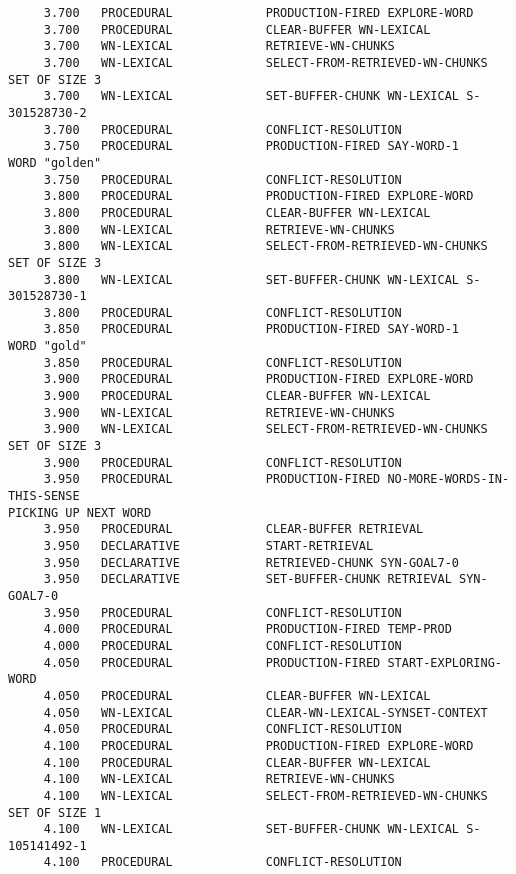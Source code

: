 \begin{verbatim}
     3.700   PROCEDURAL             PRODUCTION-FIRED EXPLORE-WORD 
     3.700   PROCEDURAL             CLEAR-BUFFER WN-LEXICAL 
     3.700   WN-LEXICAL             RETRIEVE-WN-CHUNKS 
     3.700   WN-LEXICAL             SELECT-FROM-RETRIEVED-WN-CHUNKS SET OF SIZE 3 
     3.700   WN-LEXICAL             SET-BUFFER-CHUNK WN-LEXICAL S-301528730-2 
     3.700   PROCEDURAL             CONFLICT-RESOLUTION 
     3.750   PROCEDURAL             PRODUCTION-FIRED SAY-WORD-1 
WORD "golden" 
     3.750   PROCEDURAL             CONFLICT-RESOLUTION 
     3.800   PROCEDURAL             PRODUCTION-FIRED EXPLORE-WORD 
     3.800   PROCEDURAL             CLEAR-BUFFER WN-LEXICAL 
     3.800   WN-LEXICAL             RETRIEVE-WN-CHUNKS 
     3.800   WN-LEXICAL             SELECT-FROM-RETRIEVED-WN-CHUNKS SET OF SIZE 3 
     3.800   WN-LEXICAL             SET-BUFFER-CHUNK WN-LEXICAL S-301528730-1 
     3.800   PROCEDURAL             CONFLICT-RESOLUTION 
     3.850   PROCEDURAL             PRODUCTION-FIRED SAY-WORD-1 
WORD "gold" 
     3.850   PROCEDURAL             CONFLICT-RESOLUTION 
     3.900   PROCEDURAL             PRODUCTION-FIRED EXPLORE-WORD 
     3.900   PROCEDURAL             CLEAR-BUFFER WN-LEXICAL 
     3.900   WN-LEXICAL             RETRIEVE-WN-CHUNKS 
     3.900   WN-LEXICAL             SELECT-FROM-RETRIEVED-WN-CHUNKS SET OF SIZE 3 
     3.900   PROCEDURAL             CONFLICT-RESOLUTION 
     3.950   PROCEDURAL             PRODUCTION-FIRED NO-MORE-WORDS-IN-THIS-SENSE 
PICKING UP NEXT WORD 
     3.950   PROCEDURAL             CLEAR-BUFFER RETRIEVAL 
     3.950   DECLARATIVE            START-RETRIEVAL 
     3.950   DECLARATIVE            RETRIEVED-CHUNK SYN-GOAL7-0 
     3.950   DECLARATIVE            SET-BUFFER-CHUNK RETRIEVAL SYN-GOAL7-0 
     3.950   PROCEDURAL             CONFLICT-RESOLUTION 
     4.000   PROCEDURAL             PRODUCTION-FIRED TEMP-PROD 
     4.000   PROCEDURAL             CONFLICT-RESOLUTION 
     4.050   PROCEDURAL             PRODUCTION-FIRED START-EXPLORING-WORD 
     4.050   PROCEDURAL             CLEAR-BUFFER WN-LEXICAL 
     4.050   WN-LEXICAL             CLEAR-WN-LEXICAL-SYNSET-CONTEXT 
     4.050   PROCEDURAL             CONFLICT-RESOLUTION 
     4.100   PROCEDURAL             PRODUCTION-FIRED EXPLORE-WORD 
     4.100   PROCEDURAL             CLEAR-BUFFER WN-LEXICAL 
     4.100   WN-LEXICAL             RETRIEVE-WN-CHUNKS 
     4.100   WN-LEXICAL             SELECT-FROM-RETRIEVED-WN-CHUNKS SET OF SIZE 1 
     4.100   WN-LEXICAL             SET-BUFFER-CHUNK WN-LEXICAL S-105141492-1 
     4.100   PROCEDURAL             CONFLICT-RESOLUTION 

\end{verbatim}
